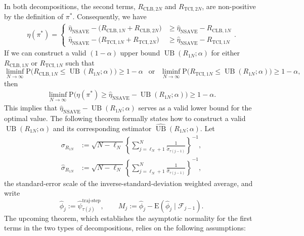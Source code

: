 \documentclass[12pt]{article}
\theoremstyle{remark}\newtheorem{remark}[theorem]{Remark}\theoremstyle{plain}
\newcommand{\E}{\mathrm{E}}
\newcommand{\EstestFunTraj}{\widehat{\psi}^{\text{traj-step}}}
\newcommand{\pr}{\mathrm{P}}
\newcommand{\UB}{\operatorname{UB}}
\begin{document}
In both decompositions, the second terms, $R_{\text{CLB}, 2N}$ and $R_{\text{TCI}, 2N}$, are non-positive by the definition of $\pi^*$. Consequently, we have 
\[
    \begin{aligned}
        \eta(\pi^*) = \left\{ \begin{array}{cc}
            \widehat{\eta}_{\text{NSAVE}} -  \big( R_{\text{CLB}, 1N} + R_{\text{CLB}, 2N} \big)  &  \geq \widehat{\eta}_{\text{NSAVE}} - R_{\text{CLB}, 1N}  \\
            \widehat{\eta}_{\text{NSAVE}} -  \big( R_{\text{TCI}, 1N} + R_{\text{TCI}, 2N} \big) &  \geq \widehat{\eta}_{\text{NSAVE}} - R_{\text{TCI}, 1N} 
        \end{array}\right. .
    \end{aligned}
\]
If we can construct a valid $(1 - \alpha)$ upper bound $\UB(R_{1N}; \alpha)$ for either $R_{\text{CLB}, 1N}$ or $R_{\text{TCI}, 1N} $ such that
\[
     \liminf_{N \rightarrow \infty} \pr \big(R_{\text{CLB}, 1N} \leq \UB(R_{1N}; \alpha) \big) \geq 1 - \alpha ~~\text{ or }  ~~\liminf_{N \rightarrow \infty} \pr \big( R_{\text{TCI}, 1N} \leq \UB(R_{1N}; \alpha) \big) \geq 1 - \alpha,
\]
then 
\[
    \begin{aligned}
        \liminf_{N \rightarrow \infty} \pr \big( \eta(\pi^*) \geq \widehat{\eta}_{\text{NSAVE}} - \UB(R_{1N}; \alpha) \big) \geq 1 - \alpha.
    \end{aligned}
\]
This implies that $\widehat{\eta}_{\text{NSAVE}} - \UB(R_{1N}; \alpha)$ serves as a valid lower bound for the optimal value. The following theorem formally states how to construct a valid $\UB(R_{1N}; \alpha)$ and its corresponding estimator $\widehat{\UB}(R_{1N}; \alpha)$. Let
\[
    \begin{aligned}
    \sigma_{R_{1N}}
    &:=
    \sqrt{N-\ell_N}
    \left\{\sum_{j=\ell_N+1}^N
    \frac{1}{\widetilde\sigma_{\tau(j-1)}}\right\}^{-1},\\
    \widehat\sigma_{R_{1N}}
    &:=
    \sqrt{N-\ell_N}
    \left\{\sum_{j=\ell_N+1}^N
    \frac{1}{\widehat\sigma_{\tau(j-1)}}\right\}^{-1},
    \end{aligned}
\]
the standard-error scale of the inverse-standard-deviation weighted
average,
and write
\[
    \widehat\phi_j:=\EstestFunTraj_{\tau(j)},
    \qquad
    M_j:=\widehat\phi_j-
    \E(\widehat\phi_j\mid\mathcal F_{j-1}).
\]
The upcoming theorem, which establishes the asymptotic normality for the first terms in the two types of decompositions, relies on the following assumptions:
\end{document}
